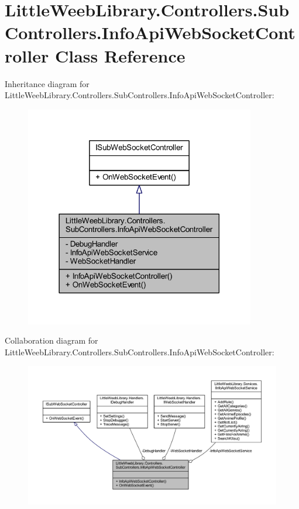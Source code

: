 \hypertarget{class_little_weeb_library_1_1_controllers_1_1_sub_controllers_1_1_info_api_web_socket_controller}{}\section{Little\+Weeb\+Library.\+Controllers.\+Sub\+Controllers.\+Info\+Api\+Web\+Socket\+Controller Class Reference}
\label{class_little_weeb_library_1_1_controllers_1_1_sub_controllers_1_1_info_api_web_socket_controller}


Inheritance diagram for Little\+Weeb\+Library.\+Controllers.\+Sub\+Controllers.\+Info\+Api\+Web\+Socket\+Controller\+:\nopagebreak
\begin{figure}[H]
\begin{center}
\leavevmode
\includegraphics[width=285pt]{class_little_weeb_library_1_1_controllers_1_1_sub_controllers_1_1_info_api_web_socket_controller__inherit__graph}
\end{center}
\end{figure}


Collaboration diagram for Little\+Weeb\+Library.\+Controllers.\+Sub\+Controllers.\+Info\+Api\+Web\+Socket\+Controller\+:\nopagebreak
\begin{figure}[H]
\begin{center}
\leavevmode
\includegraphics[width=350pt]{class_little_weeb_library_1_1_controllers_1_1_sub_controllers_1_1_info_api_web_socket_controller__coll__graph}
\end{center}
\end{figure}
